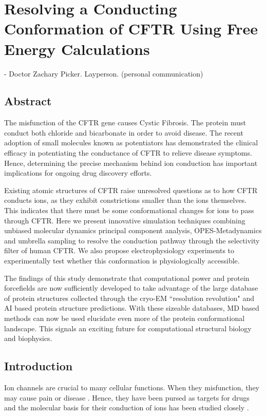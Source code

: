 \chapter{Resolving a Conducting Conformation of CFTR Using Free Energy Calculations}
\label{chap:opening}
 {- Doctor Zachary Picker. Layperson. (personal communication)}
\setcounter{figure}{0}
\renewcommand{\thefigure}{\arabic{chapter}.\arabic{figure}}


\section*{\centering Abstract} 
The misfunction of the CFTR gene causes Cystic Fibrosis. The protein must conduct both chloride and bicarbonate in order to avoid disease. The recent adoption of small molecules known as potentiators has demonstrated the clinical efficacy in potentiating the conductance of CFTR to relieve disease symptoms. Hence, determining the precise mechanism behind ion conduction has important implications for ongoing drug discovery efforts.

Existing atomic structures of CFTR raise unresolved questions as to how CFTR conducts ions, as they exhibit constrictions smaller than the ions themselves. This indicates that there must be some conformational changes for ions to pass through CFTR. Here we present innovative simulation techniques combining unbiased molecular dynamics principal component analysis, OPES-Metadynamics and umbrella sampling to resolve the conduction pathway through the selectivity filter of human CFTR. We also propose electrophysiology experiments to experimentally test whether this conformation is physiologically accessible.  

The findings of this study demonstrate that computational power and protein forcefields are now sufficiently developed to take advantage of the large database of protein structures collected through the cryo-EM ``resolution revolution" and AI based protein structure predictions. With these sizeable databases, MD based methods can now be used elucidate even more of the protein conformational landscape. This signals an exciting future for computational structural biology and biophysics.


\section{Introduction}

Ion channels are crucial to many cellular functions. When they misfunction, they may cause pain or disease \cite{}. Hence, they have been pursed as targets for drugs and the molecular basis for their conduction of ions has been studied closely \cite{}.

